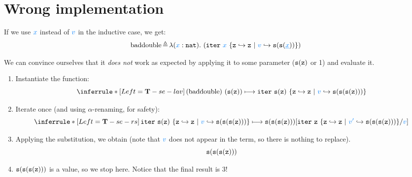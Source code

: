 \documentclass[11pt]{article}
\begin{document}
\section{Wrong implementation}

If we use $\var{x}$ instead of $\var{v}$ in the inductive case, we
get:
\[
\text{baddouble} \defi 
\clam{\tynat}{x}
{
  \citer{\ez}{v}{\esucc{\esucc{\var{\underline{x}}}}}{\var{{x}}}
}
\]

We can convince ourselves that it \emph{does not} work as expected by
applying it to some parameter (${\mathtt{s}(\mathtt{z})}$ or 1) and evaluate it.
% 
\begin{enumerate}
\item Instantiate the function: 
  \[
  \semrule
  {\tsemrulename{lav}}
  {\,}
  {\jtrans
    {\capp{\text{baddouble}}{\esucc{\ez}}}
    {
      \citer{\ez}{v}{\esucc{\esucc{\esucc{\ez}}}}{{\esucc{\ez}}}
    }}
  \]
\item   Iterate once (and using $\alpha$-renaming, for safety):
  \[
  \semrule
  {\tsemrulename{rs}}
  {\,}
  {
    \jtrans
    {
      \citer{\ez}{v}{\esucc{\esucc{\esucc{\ez}}}}{{\esucc{\ez}}}
    }
    {
      \subs
      {\esucc{\esucc{\esucc{\ez}}}}
      {
        \citer{\ez}{v'}{\esucc{\esucc{\esucc{\ez}}}}{\ez}
      }
      {v}
    }
  }
  \]
\item Applying the substitution, we obtain (note that $\var{v}$ does
  not appear in the term, so there is nothing to replace).
  \[
  {\mathtt{s}(\mathtt{s}(\mathtt{s}(\mathtt{z})))}
  \]
\item ${\mathtt{s}(\mathtt{s}(\mathtt{s}(\mathtt{z})))}$ is a value, so we stop
  here. Notice that the final result is $3$! 
\end{enumerate}
\end{document}
